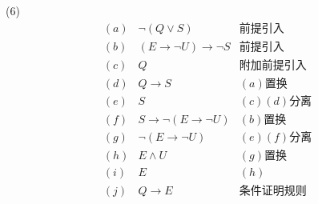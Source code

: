 \documentclass[hyperref, UTF8]{ctexart}
\begin{document}
(6)
\begin{align*}
(a) & \lnot (Q \lor S) & \text{前提引入} \\
(b) & (E \rightarrow \lnot U) \rightarrow \lnot S & \text{前提引入} \\
(c) & Q & \text{附加前提引入} \\
(d) & Q \rightarrow S & (a)\text{置换} \\
(e) & S & (c)(d)\text{分离} \\
(f) & S \rightarrow \lnot (E \rightarrow \lnot U) & (b)\text{置换} \\
(g) & \lnot (E \rightarrow \lnot U) & (e)(f)\text{分离} \\
(h) & E \land U & (g)\text{置换} \\
(i) & E & (h) \\
(j) & Q \rightarrow E & \text{条件证明规则}
\end{align*}
\end{document}
